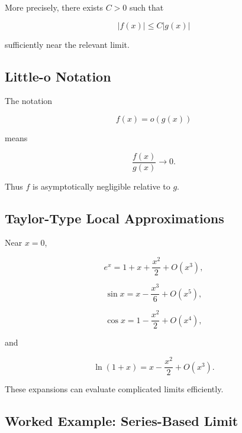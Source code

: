 More precisely, there exists \(C>0\) such that

\[
\boxed{
|f(x)|
\leq
C|g(x)|
}
\]

sufficiently near the relevant limit.

\subsection{Little-o Notation}
\label{subsec:little-o-limit-reference}

The notation

\[
\boxed{
f(x)=o(g(x))
}
\]

means

\[
\boxed{
\frac{f(x)}{g(x)}
\to0.
}
\]

Thus \(f\) is asymptotically negligible relative to \(g\).

\subsection{Taylor-Type Local Approximations}
\label{subsec:taylor-local-limit-reference}

Near \(x=0\),

\[
\boxed{
e^x
=
1+x+\frac{x^2}{2}
+
O(x^3),
}
\]

\[
\boxed{
\sin x
=
x-\frac{x^3}{6}
+
O(x^5),
}
\]

\[
\boxed{
\cos x
=
1-\frac{x^2}{2}
+
O(x^4),
}
\]

and

\[
\boxed{
\ln(1+x)
=
x-\frac{x^2}{2}
+
O(x^3).
}
\]

These expansions can evaluate complicated limits efficiently.

\subsection{Worked Example: Series-Based Limit}
\label{subsec:worked-series-limit}


